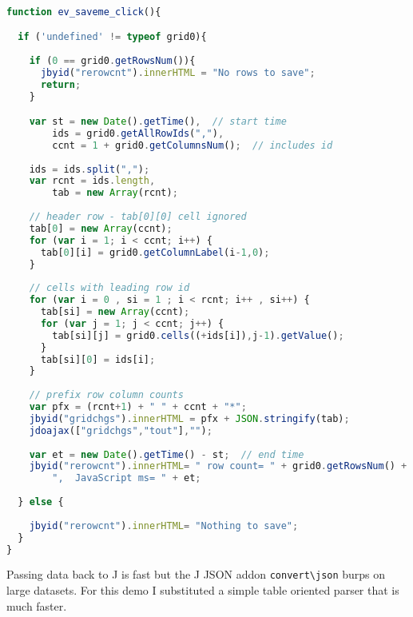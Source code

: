 \begin{tcolorbox}[breakable, size=fbox, boxrule=1pt, pad at break*=1mm,colback=cellbackground, colframe=cellborder]
\begin{lstlisting}[language=JavaScript,frame=single,framerule=0pt,label=lst:scr3516X0]

function ev_saveme_click(){

  if ('undefined' != typeof grid0){
  
    if (0 == grid0.getRowsNum()){
      jbyid("rerowcnt").innerHTML = "No rows to save"; 
      return;
    }

    var st = new Date().getTime(),  // start time  
        ids = grid0.getAllRowIds(","),
        ccnt = 1 + grid0.getColumnsNum();  // includes id
      
    ids = ids.split(",");  
    var rcnt = ids.length,
        tab = new Array(rcnt);
    
    // header row - tab[0][0] cell ignored
    tab[0] = new Array(ccnt);  
    for (var i = 1; i < ccnt; i++) {
      tab[0][i] = grid0.getColumnLabel(i-1,0); 
    }
     
    // cells with leading row id
    for (var i = 0 , si = 1 ; i < rcnt; i++ , si++) {
      tab[si] = new Array(ccnt);
      for (var j = 1; j < ccnt; j++) {
        tab[si][j] = grid0.cells((+ids[i]),j-1).getValue();
      }
      tab[si][0] = ids[i];
    }
  
    // prefix row column counts 
    var pfx = (rcnt+1) + " " + ccnt + "*";
    jbyid("gridchgs").innerHTML = pfx + JSON.stringify(tab);
    jdoajax(["gridchgs","tout"],"");
  
    var et = new Date().getTime() - st;  // end time    
    jbyid("rerowcnt").innerHTML= " row count= " + grid0.getRowsNum() +  
        ",  JavaScript ms= " + et; 
        
  } else {
  
    jbyid("rerowcnt").innerHTML= "Nothing to save";     
  }
}
\end{lstlisting}
\end{tcolorbox}

Passing data back to J is fast but the J JSON addon
\texttt{convert\textbackslash{}json} burps on large datasets. For this
demo I substituted a simple table oriented parser that is much faster.



%